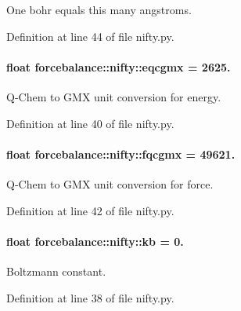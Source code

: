 \-One bohr equals this many angstroms. 



\-Definition at line 44 of file nifty.\-py.

\hypertarget{namespaceforcebalance_1_1nifty_a2b5a159b5e297e92699a10b05fa8911f}{
\paragraph[{eqcgmx}]{\setlength{\rightskip}{0pt plus 5cm}float {\bf forcebalance\-::nifty\-::eqcgmx} = 2625.}}\label{namespaceforcebalance_1_1nifty_a2b5a159b5e297e92699a10b05fa8911f}


\-Q-\/\-Chem to \-G\-M\-X unit conversion for energy. 



\-Definition at line 40 of file nifty.\-py.

\hypertarget{namespaceforcebalance_1_1nifty_a7ad933fe53e048142852569b9a288f2e}{
\paragraph[{fqcgmx}]{\setlength{\rightskip}{0pt plus 5cm}float {\bf forcebalance\-::nifty\-::fqcgmx} = 49621.}}\label{namespaceforcebalance_1_1nifty_a7ad933fe53e048142852569b9a288f2e}


\-Q-\/\-Chem to \-G\-M\-X unit conversion for force. 



\-Definition at line 42 of file nifty.\-py.

\hypertarget{namespaceforcebalance_1_1nifty_aace36d3e1ed8cd2ead67d53ec177063f}{
\paragraph[{kb}]{\setlength{\rightskip}{0pt plus 5cm}float {\bf forcebalance\-::nifty\-::kb} = 0.}}\label{namespaceforcebalance_1_1nifty_aace36d3e1ed8cd2ead67d53ec177063f}


\-Boltzmann constant. 



\-Definition at line 38 of file nifty.\-py.

